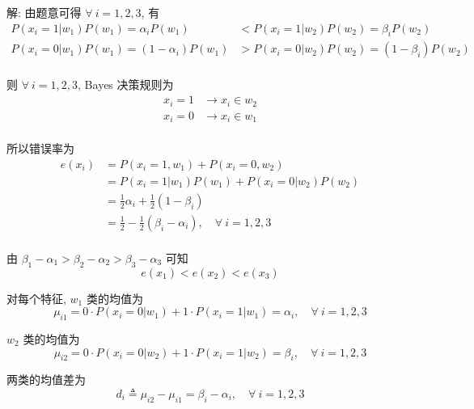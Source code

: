 \documentclass[openany]{ctexbook}
\theoremstyle{kaiti}
\theoremstyle{normal}
\begin{document}
解: 由题意可得 $\forall~i=1,2,3$, 有
\begin{equation}
  \begin{aligned}
    P(x_{i}=1|w_{1})P(w_{1})=\alpha_iP(w_{1})&<P(x_{i}=1|w_{2})P(w_{2})=\beta_iP(w_{2})\\
    P(x_{i}=0|w_{1})P(w_{1})=(1-\alpha_i)P(w_{1})&>P(x_{i}=0|w_{2})P(w_{2})=(1-\beta_i)P(w_{2})\\
  \end{aligned}
\end{equation}

则 $\forall~i=1,2,3$, Bayes 决策规则为 
\begin{equation}
  \begin{aligned}
    x_i=1&\to x_i\in w_2\\
    x_i=0&\to x_i\in w_1\\
  \end{aligned}
\end{equation}

所以错误率为
\begin{equation}
  \begin{aligned}
    e(x_i)
    &=P(x_i=1,w_1)+P(x_i=0,w_2)\\
    &=P(x_i=1|w_1)P(w_1)+P(x_i=0|w_2)P(w_2)\\
    &=\frac{1}{2}\alpha_i+\frac{1}{2}(1-\beta_i)\\
    &=\frac{1}{2}-\frac{1}{2}(\beta_i-\alpha_i),\quad\forall~i=1,2,3\\
  \end{aligned}
\end{equation}

由 $\beta_{1}-\alpha_{1}>\beta_{2}-\alpha_{2}>\beta_{3}-\alpha_{3}$ 可知
\begin{equation}
  e(x_{1})<e(x_{2})<e(x_{3})
\end{equation}

对每个特征, $w_1$ 类的均值为
\begin{equation}
  \mu_{i1}=0\cdot P(x_i=0|w_1)+1\cdot P(x_i=1|w_1)=\alpha_i,\quad\forall~i=1,2,3
\end{equation}

$w_2$ 类的均值为
\begin{equation}
  \mu_{i2}=0\cdot P(x_i=0|w_2)+1\cdot P(x_i=1|w_2)=\beta_i,\quad\forall~i=1,2,3
\end{equation}

两类的均值差为
\begin{equation}
  d_i\triangleq\mu_{i2}-\mu_{i1}=\beta_i-\alpha_i,\quad\forall~i=1,2,3
\end{equation}
\end{document}
